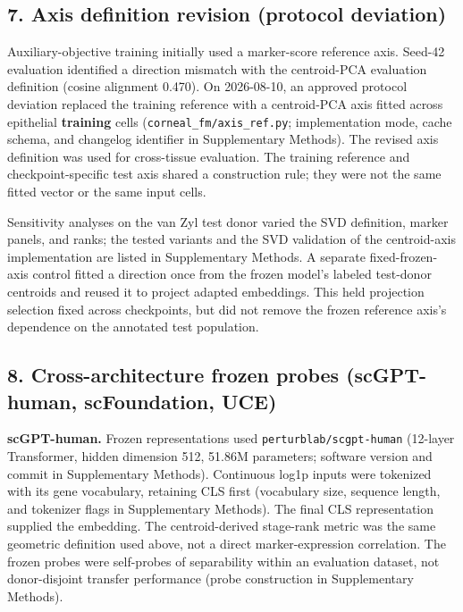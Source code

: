 \documentclass[12pt,letterpaper]{article}
\begin{document}
\subsection*{7. Axis definition revision (protocol deviation)}

Auxiliary-objective training initially used a marker-score reference axis. Seed-42 evaluation identified a direction mismatch with the centroid-PCA evaluation definition (cosine alignment 0.470). On 2026-08-10, an approved protocol deviation replaced the training reference with a centroid-PCA axis fitted across epithelial \textbf{training} cells (\texttt{corneal\_\allowbreak fm/\allowbreak axis\_\allowbreak ref.py}; implementation mode, cache schema, and changelog identifier in Supplementary Methods). The revised axis definition was used for cross-tissue evaluation. The training reference and checkpoint-specific test axis shared a construction rule; they were not the same fitted vector or the same input cells.

Sensitivity analyses on the van Zyl test donor varied the SVD definition, marker panels, and ranks; the tested variants and the SVD validation of the centroid-axis implementation are listed in Supplementary Methods. A separate fixed-frozen-axis control fitted a direction once from the frozen model's labeled test-donor centroids and reused it to project adapted embeddings. This held projection selection fixed across checkpoints, but did not remove the frozen reference axis's dependence on the annotated test population.

\subsection*{8. Cross-architecture frozen probes (scGPT-human, scFoundation, UCE)}

\textbf{scGPT-human.} Frozen representations used \texttt{perturblab/\allowbreak scgpt-\allowbreak human} (12-layer Transformer, hidden dimension 512, 51.86M parameters; software version and commit in Supplementary Methods). Continuous log1p inputs were tokenized with its gene vocabulary, retaining CLS first (vocabulary size, sequence length, and tokenizer flags in Supplementary Methods). The final CLS representation supplied the embedding. The centroid-derived stage-rank metric was the same geometric definition used above, not a direct marker-expression correlation. The frozen probes were self-probes of separability within an evaluation dataset, not donor-disjoint transfer performance (probe construction in Supplementary Methods).
\end{document}
